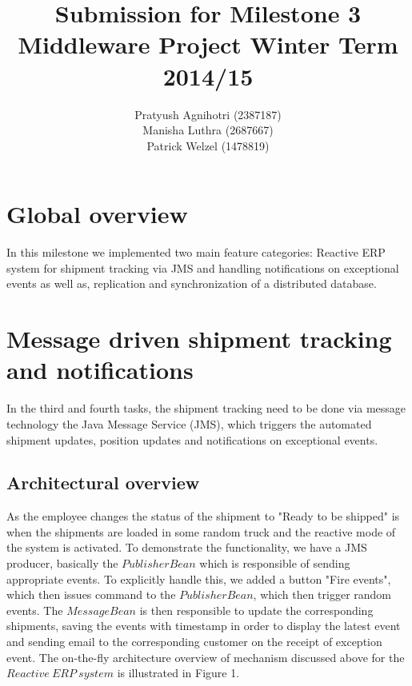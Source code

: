 \documentclass[twoside,colorbacktitle,accentcolor=tud1b]{tudexercise}
\title{Submission for Milestone 3
\linebreak[1] Middleware Project
\linebreak[1] Winter Term 2014/15}
\subtitle{Pratyush Agnihotri (2387187)\\
Manisha Luthra (2687667) \\
Patrick Welzel (1478819)}
\begin{document}
  \begin{examheader}
  \end{examheader}
\setcounter{section}{2}
\maketitle

\section*{Global overview}
In this milestone we implemented two main feature categories: Reactive ERP system for shipment tracking via JMS and handling notifications on exceptional events as well as, %
replication and synchronization of a distributed database.


\section{Message driven shipment tracking and notifications}
In the third and fourth tasks, the shipment tracking need to be done via message technology the Java Message Service (JMS), which triggers the automated shipment updates, position updates and notifications on exceptional events.

\subsection{Architectural overview}
As the employee changes the status of the shipment to "Ready to be shipped" is when the shipments are loaded in some random truck and the reactive mode of the system is activated. To demonstrate the functionality, we have a JMS producer, basically the $PublisherBean$ which is responsible of sending appropriate events. To explicitly handle this, we added a button "Fire events", which then issues command to the $PublisherBean$, which then trigger random events. The $MessageBean$ is then responsible to update the corresponding shipments, saving the events with timestamp in order to display the latest event and sending email to the corresponding customer on the receipt of exception event. The on-the-fly architecture overview of mechanism discussed above for the $Reactive \ ERP \ system$ is illustrated in Figure 1.
\end{document}
